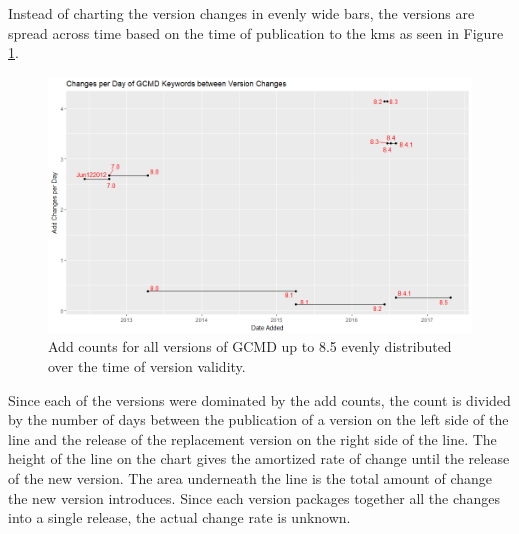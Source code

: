 Instead of charting the \gls{version} \glspl{change} in evenly wide bars, the \glspl{version} are spread across time based on the time of publication to the \gls{kms} as seen in Figure \ref{GCMDPlot1}.
\begin{figure}%
	\centering
	\includegraphics[scale=0.56]{figures/GCMDPlot1.png}
	\caption[Global Change Master Direcotry counts distributed over time.]{Add counts for all versions of GCMD up to 8.5 evenly distributed over the time of version validity.}
	\label{GCMDPlot1}
\end{figure}
Since each of the \glspl{version} were dominated by the \gls{add} counts, the count is divided by the number of days between the publication of a \gls{version} on the left side of the line and the release of the replacement \gls{version} on the right side of the line.
The height of the line on the chart gives the amortized rate of change until the release of the new version.
The area underneath the line is the total amount of change the new \gls{version} introduces.
Since each \gls{version} packages together all the \glspl{change} into a single release, the actual change rate is unknown.

